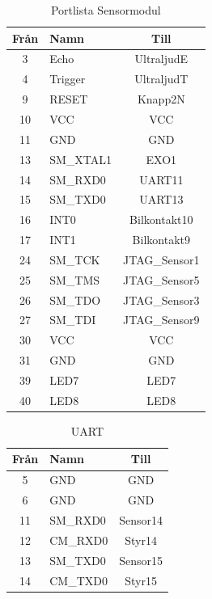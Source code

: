 \documentclass[10pt,oneside,swedish]{lips}
\begin{document}
\begin{longtable}{|c|p{17mm}|c|}
  \caption{Portlista Sensormodul}
  \hline
  Från & Namn & Till\\
  \hline \hline
    3 & Echo & UltraljudE\\
    \hline
    4 & Trigger & UltraljudT\\
    \hline
    9 & RESET & Knapp2N\\
    \hline
    10 & VCC & VCC\\
    \hline
    11 & GND & GND\\
    \hline
    13 & SM\_XTAL1 & EXO1\\
    \hline
    14 & SM\_RXD0 & UART11\\
    \hline
    15 & SM\_TXD0 & UART13\\
    \hline
    16 & INT0 & Bilkontakt10\\
    \hline
    17 & INT1 & Bilkontakt9\\
    \hline
    24 & SM\_TCK & JTAG\_Sensor1\\
    \hline
    25 & SM\_TMS & JTAG\_Sensor5\\
    \hline
    26 & SM\_TDO & JTAG\_Sensor3\\
    \hline
    27 & SM\_TDI & JTAG\_Sensor9\\
    \hline
    30 & VCC & VCC\\
    \hline
    31 & GND & GND\\
    \hline
    39 & LED7 & LED7\\
    \hline
    40 & LED8 & LED8\\
  \hline
\end{longtable}

\begin{longtable}{|c|p{17mm}|c|}
  \caption{UART}
  \hline 
  Från & Namn &  Till\\
  \hline \hline
    5 & GND & GND\\
    \hline
    6 & GND & GND\\
    \hline
    11 & SM\_RXD0 & Sensor14\\
    \hline
    12 & CM\_RXD0 & Styr14\\
    \hline
    13 & SM\_TXD0 & Sensor15\\
    \hline
    14 & CM\_TXD0 & Styr15\\
    \hline
\end{longtable}
\end{document}
